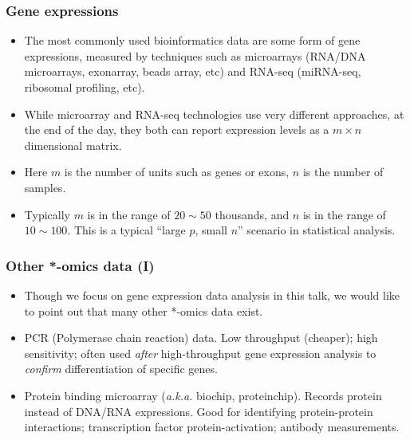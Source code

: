 \begin{frame}
  \frametitle{Gene expressions}
  \begin{itemize}
  \item The most commonly used bioinformatics data are some form of
    gene expressions, measured by techniques such as microarrays
    (RNA/DNA microarrays, exonarray, beads array, etc) and RNA-seq
    (miRNA-seq, ribosomal profiling, etc).
  \item While microarray and RNA-seq technologies use very different
    approaches, at the end of the day, they both can report expression
    levels as a $m\times n$ dimensional matrix.
  \item Here $m$ is the number of units such as genes or exons, $n$ is
    the number of samples.
  \item Typically $m$ is in the range of $20\sim 50$ thousands, and
    $n$ is in the range of $10\sim 100$. This is a typical ``large
    $p$, small $n$'' scenario in statistical analysis.
  \end{itemize}
\end{frame}

\begin{frame}
  \frametitle{Other *-omics data (I)}
  \begin{itemize}
  \item Though we focus on gene expression data analysis in this talk,
    we would like to point out that many other *-omics data exist.
  \item PCR (Polymerase chain reaction) data. Low throughput
    (cheaper); high sensitivity; often used \emph{after}
    high-throughput gene expression analysis to \emph{confirm}
    differentiation of specific genes.
  \item Protein binding microarray (\textit{a.k.a.} biochip,
    proteinchip).  Records protein instead of DNA/RNA
    expressions. Good for identifying protein-protein interactions;
    transcription factor protein-activation; antibody measurements.
  \end{itemize}
\end{frame}

